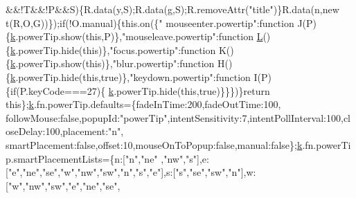 \begin{DoxyCode}
      &&!T&&!P&&S)\{R.data(y,S);R.data(g,S);R.removeAttr(\textcolor{stringliteral}{"title"})\}R.data(n,\textcolor{keyword}{new} t(R,O,G))\});\textcolor{keywordflow}{if}(!O.manual)\{this.on(\{\textcolor{stringliteral}{"
      mouseenter.powertip"}:\textcolor{keyword}{function} J(P)\{\hyperlink{jquery_8js_ab26645c014aa005ecedef329ecf58c99}{k}.powerTip.show(\textcolor{keyword}{this},P)\},\textcolor{stringliteral}{"mouseleave.powertip"}:\textcolor{keyword}{function} 
      \hyperlink{jquery_8js_a38ee4c0b5f4fe2a18d0c783af540d253}{L}()\{\hyperlink{jquery_8js_ab26645c014aa005ecedef329ecf58c99}{k}.powerTip.hide(\textcolor{keyword}{this})\},\textcolor{stringliteral}{"focus.powertip"}:\textcolor{keyword}{function} K()\{\hyperlink{jquery_8js_ab26645c014aa005ecedef329ecf58c99}{k}.powerTip.show(\textcolor{keyword}{this})\},\textcolor{stringliteral}{"blur.powertip"}:\textcolor{keyword}{function}
       H()\{\hyperlink{jquery_8js_ab26645c014aa005ecedef329ecf58c99}{k}.powerTip.hide(\textcolor{keyword}{this},\textcolor{keyword}{true})\},\textcolor{stringliteral}{"keydown.powertip"}:\textcolor{keyword}{function} I(P)\{\textcolor{keywordflow}{if}(P.keyCode===27)\{
      \hyperlink{jquery_8js_ab26645c014aa005ecedef329ecf58c99}{k}.powerTip.hide(\textcolor{keyword}{this},\textcolor{keyword}{true})\}\}\})\}\textcolor{keywordflow}{return} \textcolor{keyword}{this}\};\hyperlink{jquery_8js_ab26645c014aa005ecedef329ecf58c99}{k}.fn.powerTip.defaults=\{fadeInTime:200,fadeOutTime:100,
      followMouse:\textcolor{keyword}{false},popupId:\textcolor{stringliteral}{"powerTip"},intentSensitivity:7,intentPollInterval:100,closeDelay:100,placement:\textcolor{stringliteral}{"n"},
      smartPlacement:\textcolor{keyword}{false},offset:10,mouseOnToPopup:\textcolor{keyword}{false},manual:\textcolor{keyword}{false}\};\hyperlink{jquery_8js_ab26645c014aa005ecedef329ecf58c99}{k}.fn.powerTip.smartPlacementLists=\{n:[\textcolor{stringliteral}{"n"},\textcolor{stringliteral}{"ne"}
      ,\textcolor{stringliteral}{"nw"},\textcolor{stringliteral}{"s"}],e:[\textcolor{stringliteral}{"e"},\textcolor{stringliteral}{"ne"},\textcolor{stringliteral}{"se"},\textcolor{stringliteral}{"w"},\textcolor{stringliteral}{"nw"},\textcolor{stringliteral}{"sw"},\textcolor{stringliteral}{"n"},\textcolor{stringliteral}{"s"},\textcolor{stringliteral}{"e"}],s:[\textcolor{stringliteral}{"s"},\textcolor{stringliteral}{"se"},\textcolor{stringliteral}{"sw"},\textcolor{stringliteral}{"n"}],w:[\textcolor{stringliteral}{"w"},\textcolor{stringliteral}{"nw"},\textcolor{stringliteral}{"sw"},\textcolor{stringliteral}{"e"},\textcolor{stringliteral}{"ne"},\textcolor{stringliteral}{"se"},\textcolor{stringliteral}{
}
\end{DoxyCode}

